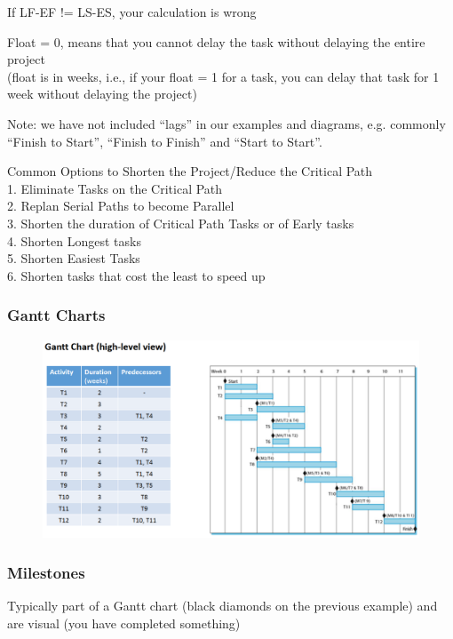\documentclass[]{project_plan}
\begin{document}
If LF-EF != LS-ES, your calculation is wrong

Float = 0, means that you cannot delay the task without delaying the entire project\\
(float is in weeks, i.e., if your float = 1 for a task, you can delay that task for 1 week without delaying the project)

Note: we have not included “lags” in our examples and diagrams, e.g. commonly “Finish to Start”,
“Finish to Finish” and “Start to Start”.

Common Options to Shorten the Project/Reduce the Critical Path\\
1. Eliminate Tasks on the Critical Path\\
2. Replan Serial Paths to become Parallel\\
3. Shorten the duration of Critical Path Tasks or of Early tasks\\
4. Shorten Longest tasks\\
5. Shorten Easiest Tasks\\
6. Shorten tasks that cost the least to speed up

\subsubsection{Gantt Charts}
\begin{figure}[h!]
  \centering
  \includegraphics[width=\linewidth]{gantt_chart_example.png}
\end{figure}

\newpage

\subsubsection{Milestones}
Typically part of a Gantt chart (black diamonds on the previous example) and are visual (you have completed something)
\end{document}
